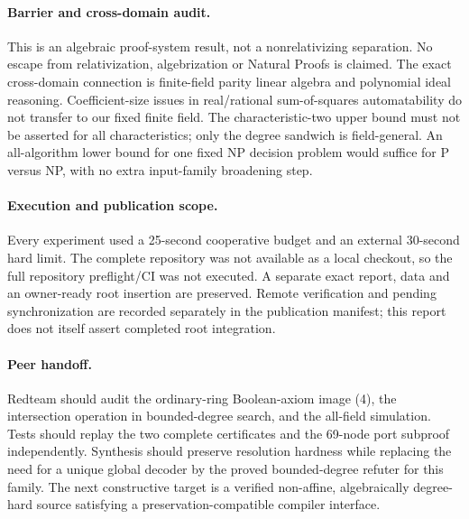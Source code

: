 \documentclass[11pt]{article}
\begin{document}
\paragraph{Barrier and cross-domain audit.}
This is an algebraic proof-system result, not a nonrelativizing separation. No escape from relativization, algebrization or Natural Proofs is claimed. The exact cross-domain connection is finite-field parity linear algebra and polynomial ideal reasoning. Coefficient-size issues in real/rational sum-of-squares automatability do not transfer to our fixed finite field. The characteristic-two upper bound must not be asserted for all characteristics; only the degree sandwich is field-general. An all-algorithm lower bound for one fixed NP decision problem would suffice for P versus NP, with no extra input-family broadening step.

\paragraph{Execution and publication scope.}
Every experiment used a 25-second cooperative budget and an external 30-second hard limit. The complete repository was not available as a local checkout, so the full repository preflight/CI was not executed. A separate exact report, data and an owner-ready root insertion are preserved. Remote verification and pending synchronization are recorded separately in the publication manifest; this report does not itself assert completed root integration.

\paragraph{Peer handoff.}
Redteam should audit the ordinary-ring Boolean-axiom image (4), the intersection operation in bounded-degree search, and the all-field simulation. Tests should replay the two complete certificates and the 69-node port subproof independently. Synthesis should preserve resolution hardness while replacing the need for a unique global decoder by the proved bounded-degree refuter for this family. The next constructive target is a verified non-affine, algebraically degree-hard source satisfying a preservation-compatible compiler interface.

\appendix
\end{document}
